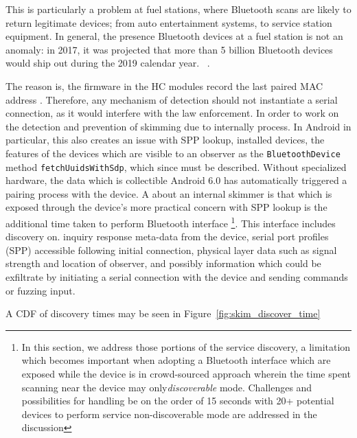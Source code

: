 This is particularly a problem at fuel stations, where Bluetooth scans are
likely to return legitimate devices; from auto entertainment systems, to
service station equipment.
%
In general, the presence Bluetooth devices at a fuel station is not an anomaly:
in 2017, it was projected that more than 5 billion Bluetooth devices would ship
out during the 2019 calendar year. ~\cite{bluetooth-popularity}.

The reason is, the firmware in the HC modules record the last paired MAC
address . Therefore, any mechanism of detection should not
instantiate a serial connection, as it would interfere with the law enforcement. In order to work on the detection and prevention of skimming due to internally
process. In Android in particular, this also creates an issue with SPP lookup, installed devices, the features of the devices which are visible to an observer
as the \texttt{BluetoothDevice} method \texttt{fetchUuidsWithSdp}, which since must be described. Without specialized hardware, the data which is collectible
Android 6.0 has automatically triggered a pairing process with the device. A   about an internal skimmer is that which is exposed through the device's
more practical concern with SPP lookup is the additional time taken to perform Bluetooth interface \footnote{In this section, we address those portions of the
service discovery, a limitation which becomes important when adopting a        Bluetooth interface which are exposed while the device is in
crowd-sourced approach wherein the time spent scanning near the device may only\textit{discoverable} mode. Challenges and possibilities for handling
be on the order of 15 seconds with 20+ potential devices to perform service    non-discoverable mode are addressed in the discussion}. This interface includes
discovery on.                                                                  inquiry response meta-data from the device, serial port profiles (SPP)
accessible following initial connection, physical layer data such as signal
strength and location of observer, and possibly information which could be
exfiltrate by initiating a serial connection with the device and sending
commands or fuzzing input.

A CDF of discovery times may be seen in Figure~\ref{fig:skim_discover_time}










